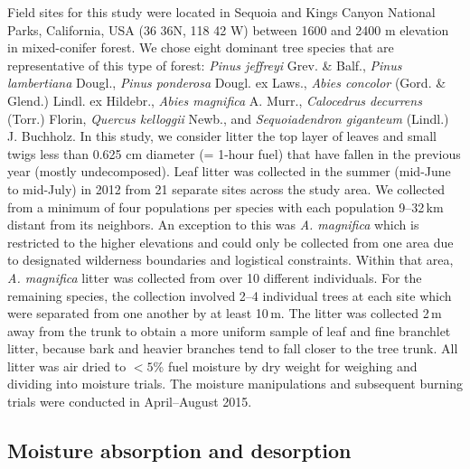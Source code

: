 \documentclass[letterpaper,12pt]{article}
\begin{document}
Field sites for this study were located in Sequoia and Kings Canyon National
Parks, California, USA (36 36N, 118 42 W) between 1600 and 2400 m elevation in
mixed-conifer forest. We chose eight dominant tree species that are
representative of this type of forest: \emph{Pinus jeffreyi} Grev. \& Balf.,
\emph{Pinus lambertiana} Dougl., \emph{Pinus ponderosa} Dougl. ex Laws.,
\emph{Abies concolor} (Gord. \& Glend.) Lindl. ex Hildebr., \emph{Abies
  magnifica} A. Murr., \emph{Calocedrus decurrens} (Torr.) Florin,
\emph{Quercus kelloggii} Newb., and \emph{Sequoiadendron giganteum} (Lindl.) J.
Buchholz. In this study, we consider litter the top layer of leaves and small
twigs less than 0.625 cm diameter (= 1-hour fuel) that have fallen in the
previous year (mostly undecomposed). Leaf litter was collected in the summer
(mid-June to mid-July) in 2012 from 21 separate sites across the study area. We
collected from a minimum of four populations per species with each population
9--32\,km distant from its neighbors. An exception to this was \emph{A.
  magnifica} which is restricted to the higher elevations and could only be
collected from one area due to designated wilderness boundaries and logistical
constraints. Within that area, \emph{A. magnifica} litter was collected from
over 10 different individuals. For the remaining species, the collection
involved 2--4 individual trees at each site which were separated from one
another by at least 10\,m. The litter was collected 2\,m away from the trunk to
obtain a more uniform sample of leaf and fine branchlet litter, because bark
and heavier branches tend to fall closer to the tree trunk. All litter was air
dried to $< 5$\% fuel moisture by dry weight for weighing and dividing into
moisture trials. The moisture manipulations and subsequent burning trials were
conducted in April--August 2015.

\subsection*{Moisture absorption and desorption}
\end{document}

